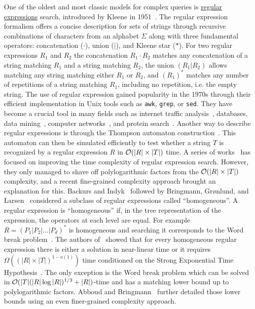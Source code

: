 One of the oldest and most classic models for complex queries is \ul{regular expressions} search, introduced by Kleene in 1951~\cite{RM-704}.
The regular expression formalism offers a concise description for sets of strings through recursive combinations of characters from an alphabet $\Sigma$ along with three fundamental operators: concatenation ($\cdot$), union ($|$), and Kleene star ($\ast$).
For two regular expressions $R_1$ and $R_2$ the concatenation $R_1\cdot R_2$ matches any concatenation of a string matching $R_1$ and a string matching $R_2$, the union $(R_1|R_2)$ allows matching any string matching either $R_1$ or $R_2$, and $(R_1)^\ast$ matches any number of repetitions of a string matching $R_1$, including no repetition, i.e. the empty string.
The use of regular expression gained popularity in the 1970s through their efficient implementation in Unix tools such as \texttt{awk}, \texttt{grep}, or \texttt{sed}.
They have become a crucial tool in many fields such as internet traffic analysis~\cite{4221791,4579527}, databases, data mining~\cite{1000341,10.5555/645927.672035,10.1145/375551.375569}, computer networks~\cite{10.1145/1159913.1159952}, and protein search~\cite{10.1145/369133.369220}.
Another way to describe regular expressions is through the Thompson automaton construction~\cite{Thompson_automaton}. This automaton can then be simulated efficiently to test whether a string $T$ is recognized by a regular expression $R$ in $\mathcal{O}(|R| \times |T|)$ time.
A series of works~\cite{10.1145/128749.128755,BILLE2008486,10.1007/978-3-642-02927-1_16,10.1007/11786986_56,doi:10.1137/1.9781611973075.104} has focused on improving the time complexity of regular expression search. However, they only managed to shave off polylogarithmic factors from the $\mathcal{O}(|R| \times |T|)$ complexity, and a recent fine-grained complexity approach brought an explanation for this.
Backurs and Indyk~\cite{DBLP:conf/focs/BackursI16} followed by Bringmann, Gr{\o}nlund, and Larsen~\cite{8104068} considered a subclass of regular expressions called ``homogeneous''. A regular expression is ``homogeneous'' if, in the tree representation of the expression, the operators at each level are equal. For example $R=(P_1|P_2|...|P_d)^\ast$ is homogeneous and searching it corresponds to the Word break problem~\cite{wordbreak1,wordbreak2}. The authors of~\cite{DBLP:conf/focs/BackursI16,8104068} showed that for every homogeneous regular expression there is either a solution in near-linear time or it requires $\Omega((|R| \times |T|)^{1-o(1)})$ time conditioned on the Strong Exponential Time Hypothesis~\cite{IMPAGLIAZZO2001367}. The only exception is the Word break problem which can be solved in $\mathcal{O}(|T| (|R| \log |R|)^{1/3}+|R|)$-time and has a matching lower bound up to polylogarithmic factors. Abboud and Bringmann~\cite{DBLP:conf/icalp/AbboudB18} further detailed those lower bounds using an even finer-grained complexity approach.
